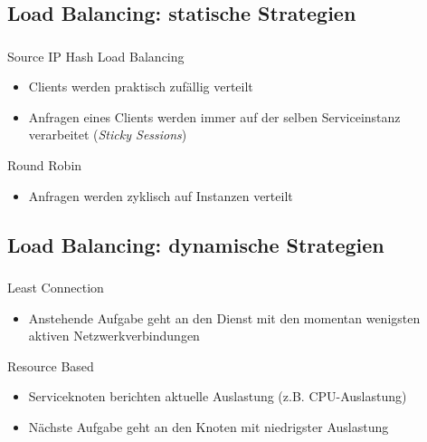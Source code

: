 \subsection{Load Balancing: statische Strategien}
\begin{frame}
    \frametitle{\insertsection}
    \framesubtitle{\insertsubsection}
    \begin{block}{Source IP Hash Load Balancing}
        \begin{itemize}
            \item Clients werden praktisch zufällig verteilt
            \item Anfragen eines Clients werden immer auf der selben Serviceinstanz verarbeitet (\textit{Sticky Sessions})
        \end{itemize}
    \end{block}
    \begin{block}{Round Robin}
        \begin{itemize}
            \item Anfragen werden zyklisch auf Instanzen verteilt
        \end{itemize}
    \end{block}
\end{frame}

\subsection{Load Balancing: dynamische Strategien}
\begin{frame}
    \frametitle{\insertsection}
    \framesubtitle{\insertsubsection}
    \begin{block}{Least Connection}
        \begin{itemize}
            \item Anstehende Aufgabe geht an den Dienst mit den momentan wenigsten aktiven Netzwerkverbindungen
        \end{itemize}
    \end{block}
    \begin{block}{Resource Based}
        \begin{itemize}
            \item Serviceknoten berichten aktuelle Auslastung (z.B. CPU-Auslastung)
            \item Nächste Aufgabe geht an den Knoten mit niedrigster Auslastung
        \end{itemize}
    \end{block}
\end{frame}

